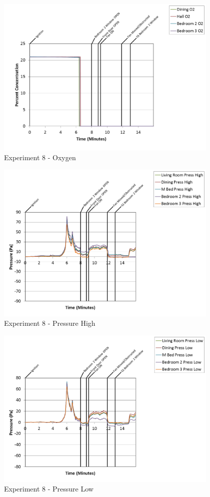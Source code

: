 \documentclass{article}
\begin{document}
\begin{appendices}
\clearpage

\begin{figure}[h!]
	\centering
	\includegraphics[height=3.05in]{0_Images/Results_Charts/Exp_8_Charts/Oxygen.png}
	\caption{Experiment 8 - Oxygen}
\end{figure}


\begin{figure}[h!]
	\centering
	\includegraphics[height=3.05in]{0_Images/Results_Charts/Exp_8_Charts/PressureHigh.png}
	\caption{Experiment 8 - Pressure High}
\end{figure}

\clearpage

\begin{figure}[h!]
	\centering
	\includegraphics[height=3.05in]{0_Images/Results_Charts/Exp_8_Charts/PressureLow.png}
	\caption{Experiment 8 - Pressure Low}
\end{figure}



\end{appendices}
\end{document}
